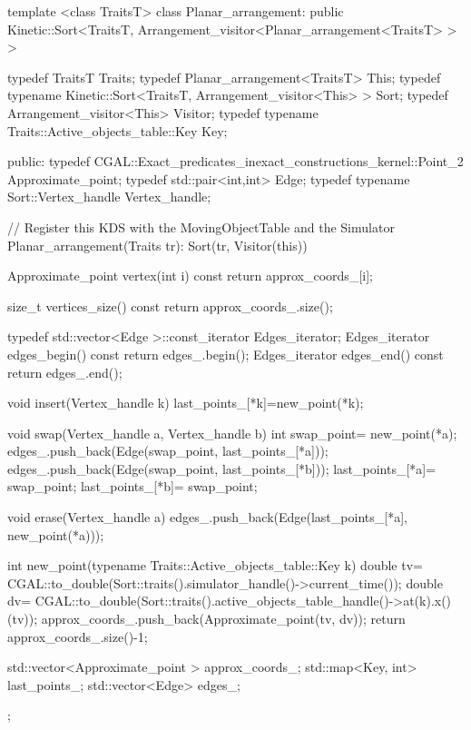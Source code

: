 \begin{ccExampleCode}

template <class TraitsT> 
class Planar_arrangement: 
  public Kinetic::Sort<TraitsT, 
		       Arrangement_visitor<Planar_arrangement<TraitsT> > > {
  typedef TraitsT Traits;
  typedef Planar_arrangement<TraitsT> This;
  typedef typename Kinetic::Sort<TraitsT,
				 Arrangement_visitor<This> > Sort;
  typedef Arrangement_visitor<This> Visitor;
  typedef typename Traits::Active_objects_table::Key Key;

public:
  typedef CGAL::Exact_predicates_inexact_constructions_kernel::Point_2 Approximate_point;
  typedef std::pair<int,int> Edge;
  typedef typename Sort::Vertex_handle Vertex_handle; 

  // Register this KDS with the MovingObjectTable and the Simulator
  Planar_arrangement(Traits tr): Sort(tr, Visitor(this)) {}

  Approximate_point vertex(int i) const
  {
    return approx_coords_[i];
  }

  size_t vertices_size() const
  {
    return approx_coords_.size();
  }

  typedef std::vector<Edge >::const_iterator Edges_iterator;
  Edges_iterator edges_begin() const
  {
    return edges_.begin();
  }
  Edges_iterator edges_end() const
  {
    return edges_.end();
  }

  void insert(Vertex_handle k) {
    last_points_[*k]=new_point(*k);
  }

  void swap(Vertex_handle a, Vertex_handle b) {
    int swap_point= new_point(*a);
    edges_.push_back(Edge(swap_point, last_points_[*a]));
    edges_.push_back(Edge(swap_point, last_points_[*b]));
    last_points_[*a]= swap_point;
    last_points_[*b]= swap_point;
  }

  void erase(Vertex_handle a) {
    edges_.push_back(Edge(last_points_[*a], new_point(*a)));
  }

  int new_point(typename Traits::Active_objects_table::Key k) {
    double tv= CGAL::to_double(Sort::traits().simulator_handle()->current_time());
    double dv= CGAL::to_double(Sort::traits().active_objects_table_handle()->at(k).x()(tv));
    approx_coords_.push_back(Approximate_point(tv, dv));
    return approx_coords_.size()-1;
  }

  std::vector<Approximate_point > approx_coords_;
  std::map<Key, int> last_points_;
  std::vector<Edge> edges_;

};
\end{ccExampleCode}

